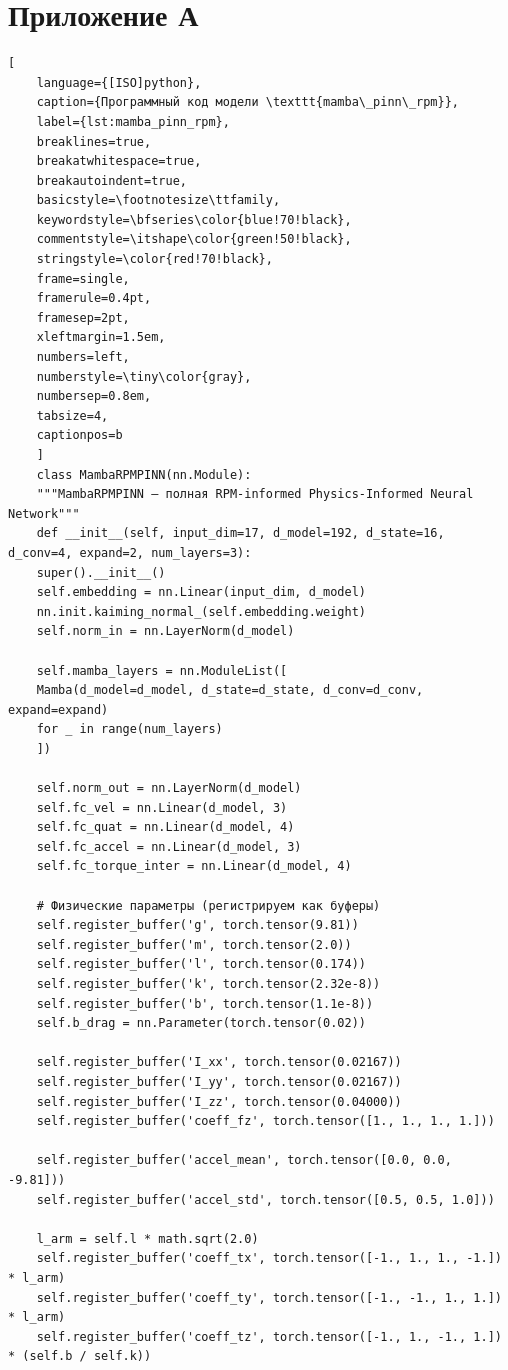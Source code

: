 \section*{Приложение А}

\begin{lstlisting}[
	language={[ISO]python},
	caption={Программный код модели \texttt{mamba\_pinn\_rpm}},
	label={lst:mamba_pinn_rpm},
	breaklines=true,
	breakatwhitespace=true,
	breakautoindent=true,
	basicstyle=\footnotesize\ttfamily,
	keywordstyle=\bfseries\color{blue!70!black},
	commentstyle=\itshape\color{green!50!black},
	stringstyle=\color{red!70!black},
	frame=single,
	framerule=0.4pt,
	framesep=2pt,
	xleftmargin=1.5em,
	numbers=left,
	numberstyle=\tiny\color{gray},
	numbersep=0.8em,
	tabsize=4,
	captionpos=b
	]
	class MambaRPMPINN(nn.Module):
	"""MambaRPMPINN — полная RPM-informed Physics-Informed Neural Network"""
	def __init__(self, input_dim=17, d_model=192, d_state=16, d_conv=4, expand=2, num_layers=3):
	super().__init__()
	self.embedding = nn.Linear(input_dim, d_model)
	nn.init.kaiming_normal_(self.embedding.weight)
	self.norm_in = nn.LayerNorm(d_model)
	
	self.mamba_layers = nn.ModuleList([
	Mamba(d_model=d_model, d_state=d_state, d_conv=d_conv, expand=expand)
	for _ in range(num_layers)
	])
	
	self.norm_out = nn.LayerNorm(d_model)
	self.fc_vel = nn.Linear(d_model, 3)
	self.fc_quat = nn.Linear(d_model, 4)
	self.fc_accel = nn.Linear(d_model, 3)
	self.fc_torque_inter = nn.Linear(d_model, 4)
	
	# Физические параметры (регистрируем как буферы)
	self.register_buffer('g', torch.tensor(9.81))
	self.register_buffer('m', torch.tensor(2.0))
	self.register_buffer('l', torch.tensor(0.174))
	self.register_buffer('k', torch.tensor(2.32e-8))
	self.register_buffer('b', torch.tensor(1.1e-8))
	self.b_drag = nn.Parameter(torch.tensor(0.02))
	
	self.register_buffer('I_xx', torch.tensor(0.02167))
	self.register_buffer('I_yy', torch.tensor(0.02167))
	self.register_buffer('I_zz', torch.tensor(0.04000))
	self.register_buffer('coeff_fz', torch.tensor([1., 1., 1., 1.]))
	
	self.register_buffer('accel_mean', torch.tensor([0.0, 0.0, -9.81]))
	self.register_buffer('accel_std', torch.tensor([0.5, 0.5, 1.0]))
	
	l_arm = self.l * math.sqrt(2.0)
	self.register_buffer('coeff_tx', torch.tensor([-1., 1., 1., -1.]) * l_arm)
	self.register_buffer('coeff_ty', torch.tensor([-1., -1., 1., 1.]) * l_arm)
	self.register_buffer('coeff_tz', torch.tensor([-1., 1., -1., 1.]) * (self.b / self.k))
	

\end{lstlisting}
